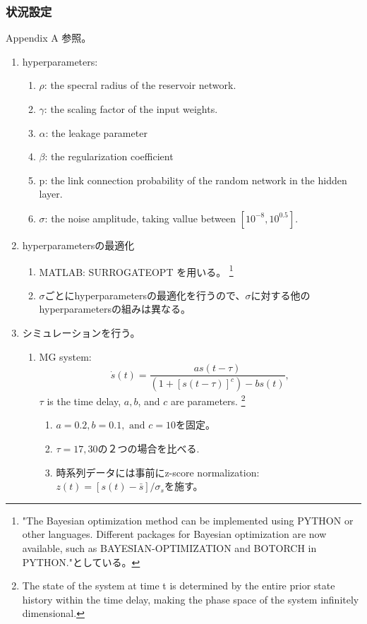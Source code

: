 \subsubsection{状況設定}
Appendix A 参照。
\begin{enumerate}
  \item hyperparameters:\begin{enumerate}
    \item $\rho$: the specral radius of the  reservoir network.
    \item $\gamma$: the scaling factor of the input weights.
    \item $\alpha$: the leakage parameter 
    \item $\beta$: the regularization coefficient 
    \item p: the link connection probability of the random network in the hidden layer.
    \item $\sigma$: the noise amplitude, taking vallue between $[10^{-8}, 10^{0.5}]$.
  \end{enumerate}
  \item hyperparametersの最適化\begin{enumerate}
    \item MATLAB: SURROGATEOPT を用いる。
      \footnote{"The Bayesian
      optimization method can be implemented using PYTHON or
      other languages. Different packages for Bayesian optimization are now available, such as BAYESIAN-OPTIMIZATION and
      BOTORCH in PYTHON."としている。}
    \item $\sigma$ごとにhyperparametersの最適化を行うので、$\sigma$に対する他のhyperparametersの組みは異なる。
  \end{enumerate}
  \item シミュレーションを行う。
  \begin{enumerate}
    \item MG system: 
    $$\dot{s}(t)=\frac{a s(t-\tau)}{\left(1+[s(t-\tau)]^c\right)-b s(t)},$$ $\tau$ is the time delay, $a, b$, and $c$ are parameters.
    \footnote{The state of the system at time t is determined by the entire prior state history
    within the time delay, making the phase space of the system
    infinitely dimensional.}  
    \begin{enumerate}
      \item $a=0.2, b=0.1, \text { and } c=10$を固定。
      \item $\tau=17, 30$の２つの場合を比べる.
      \item 時系列データには事前にz-score normalization: $z(t)=[s(t)-\bar{s}] / \sigma_s$を施す。

\end{enumerate}
\end{enumerate}
\end{enumerate}
